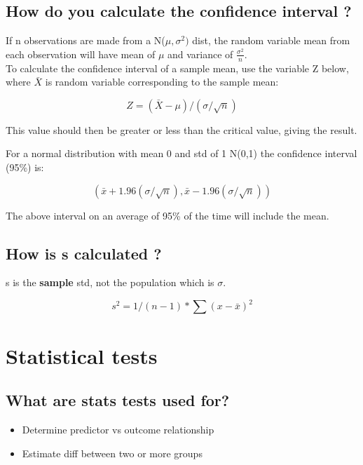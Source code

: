 \documentclass[11pt]{scrartcl} %
\begin{document}
\subsection{How do you calculate the confidence interval
?}

If n observations are made from a N(\(\mu,\sigma^2)\) dist, the random variable mean from each observation will have
mean of \(\mu\) and variance of \(\frac{\sigma^2}{n}\).\\

To calculate the confidence interval of a sample mean, use the
variable Z below, where \(\bar{X}\) is random variable corresponding to the
sample mean:

\begin{equation}
	Z = (\bar{X} - \mu)/ (\sigma/ \sqrt{n})
\end{equation}

This value should then be greater or less than the critical value, giving the result.

For a normal distribution with mean 0 and std of 1 N(0,1) the confidence
interval (95\%) is:

\begin{equation}
	(\bar{x} + 1.96 (\sigma/\sqrt{n}),\bar{x} - 1.96 (\sigma/\sqrt{n}))
\end{equation}

The above interval on an average of 95\% of the time will include the
mean.

\subsection{How is s calculated ?}

s is the \textbf{sample} std, not the population which is \(\sigma\).

\begin{equation}
	s^2 = 1/(n-1) * \sum(x-\bar{x})^2
\end{equation}

\section{Statistical tests}

\subsection{What are stats tests used for?}

\begin{itemize}
	\item Determine predictor vs outcome relationship
	\item Estimate diff between two or more groups
\end{itemize}
\end{document}

